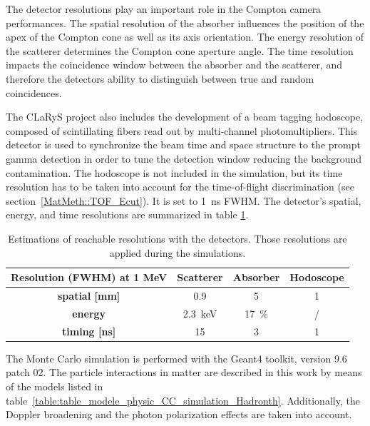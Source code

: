 The detector resolutions play an important role in the Compton camera performances. The spatial resolution of the absorber influences the position of the apex of the Compton cone as well as its axis orientation. The energy resolution of the scatterer determines the Compton cone aperture angle. The time resolution impacts the coincidence window between the absorber and the scatterer, and therefore the detectors ability to distinguish between true and random coincidences.

The CLaRyS project also includes the development of a beam tagging hodoscope, composed of scintillating fibers read out by multi-channel photomultipliers. This detector is used to synchronize the beam time and space structure to the prompt gamma detection in order to tune the detection window reducing the background contamination. The hodoscope is not included in the simulation, but its time resolution has to be taken into account for the time-of-flight discrimination (see section~\ref{MatMeth::TOF_Ecut}). It is set to 1~ns FWHM. 
The detector's spatial, energy, and time resolutions are summarized in table \ref{table:table_resolution_detecteurs_CC_simulation_Hadronth}.

\begin{table}
\centering
\caption{Estimations of reachable resolutions with the detectors. Those resolutions are applied during the simulations.}
\begin{tabular}{cccc}
\hline
\textbf{Resolution (FWHM) at 1 MeV} & \textbf{Scatterer} & \textbf{Absorber} & \textbf{Hodoscope}\\
\hline 
\textbf{spatial [mm]	}			 &     0.9		 &  5 &	 1\\
\textbf{energy}				&	2.3~keV		&  17~\%	&	/\\
\textbf{timing [ns]}	        		&	15			&	3 	&  1\\
\hline
\end{tabular}
\label{table:table_resolution_detecteurs_CC_simulation_Hadronth}
\end{table}
    
The Monte Carlo simulation is performed with the Geant4 toolkit, version 9.6 patch 02. 
The particle interactions in matter are described in this work by means of the models listed in table~\ref{table:table_modele_physic_CC_simulation_Hadronth}. Additionally, the Doppler broadening and the photon polarization effects are taken into account.
 

